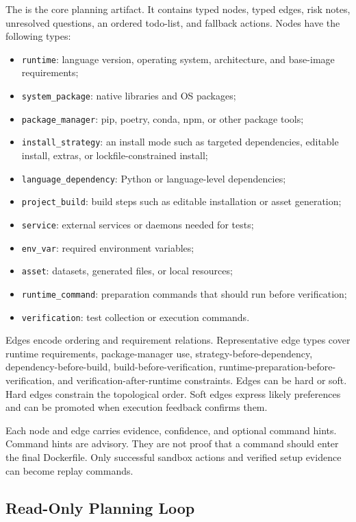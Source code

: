 The \ttg is the core planning artifact.
It contains typed nodes, typed edges, risk notes, unresolved questions, an ordered todo-list, and fallback actions.
Nodes have the following types:

\begin{itemize}[leftmargin=*]
  \item \texttt{runtime}: language version, operating system, architecture, and base-image requirements;
  \item \texttt{system\_package}: native libraries and OS packages;
  \item \texttt{package\_manager}: pip, poetry, conda, npm, or other package tools;
  \item \texttt{install\_strategy}: an install mode such as targeted dependencies, editable install, extras, or lockfile-constrained install;
  \item \texttt{language\_dependency}: Python or language-level dependencies;
  \item \texttt{project\_build}: build steps such as editable installation or asset generation;
  \item \texttt{service}: external services or daemons needed for tests;
  \item \texttt{env\_var}: required environment variables;
  \item \texttt{asset}: datasets, generated files, or local resources;
  \item \texttt{runtime\_command}: preparation commands that should run before verification;
  \item \texttt{verification}: test collection or execution commands.
\end{itemize}

Edges encode ordering and requirement relations.
Representative edge types cover runtime requirements, package-manager use, strategy-before-dependency, dependency-before-build, build-before-verification, runtime-preparation-before-verification, and verification-after-runtime constraints.
Edges can be hard or soft.
Hard edges constrain the topological order.
Soft edges express likely preferences and can be promoted when execution feedback confirms them.

Each node and edge carries evidence, confidence, and optional command hints.
Command hints are advisory.
They are not proof that a command should enter the final Dockerfile.
Only successful sandbox actions and verified setup evidence can become replay commands.

\subsection{Read-Only Planning Loop}

